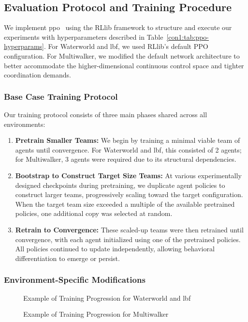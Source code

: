 \documentclass{article}
\begin{document}
\subsection{Evaluation Protocol and Training Procedure}

We implement \gls{ppo}~\cite{schulman2017} using the RLlib 
framework to structure and execute our experiments with hyperparameters described in
Table~\cref{con1:tab:ppo-hyperparams}. For Waterworld and \gls{lbf}, 
we used RLlib's default PPO configuration. For Multiwalker, we modified the default 
network architecture to better accommodate the higher-dimensional continuous control space and 
tighter coordination demands.

\subsubsection{Base Case Training Protocol}

Our training protocol consists of three main phases shared across all environments:
\begin{enumerate}
    \item \textbf{Pretrain Smaller Teams:} We begin by training a minimal viable team of 
        agents until convergence. For Waterworld and \gls{lbf}, this consisted of 2 agents; 
        for Multiwalker, 3 agents were required due to its structural dependencies.
    \item \textbf{Bootstrap to Construct Target Size Teams:} At various experimentally 
        designed checkpoints during pretraining, we duplicate agent policies to construct 
        larger teams, progressively scaling toward the target configuration. 
        When the target team size exceeded a multiple of the available pretrained policies, 
        one additional copy was selected at random.
    \item \textbf{Retrain to Convergence:} These scaled-up teams were then retrained until 
        convergence, with each agent initialized using one of the pretrained policies. 
        All policies continued to update independently, allowing behavioral differentiation to 
        emerge or persist.
\end{enumerate}

\subsubsection{Environment-Specific Modifications}

\begin{figure}[!ht]
    \centering 
    \caption{Example of Training Progression for Waterworld and \gls{lbf}}
    \label{con1:fig:training_1}
\end{figure}
\begin{figure}[!ht]
    \centering
    \caption{Example of Training Progression for Multiwalker}
    \label{con1:fig:training_2}
\end{figure}
\end{document}

